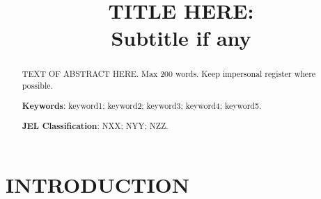 \documentclass[12pt]{article}
\title{\Large TITLE HERE: \\Subtitle if any}
\author{}
\date{}
\begin{document}
\maketitle

\begin{abstract}
\noindent TEXT OF ABSTRACT HERE.
Max 200 words. Keep impersonal register where possible.

\vspace{.25cm}
\noindent \textbf{Keywords}: keyword1; keyword2; keyword3; keyword4; keyword5.

\vspace{.25cm}
\noindent \textbf{JEL Classification}: NXX; NYY; NZZ.
\end{abstract}

\newpage

\section{INTRODUCTION}


\clearpage
\printbibliography[title={FOOTNOTE REFERENCES}]
\end{document}
